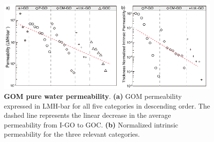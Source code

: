 \begin{figure}
  \centering
  \includegraphics[width=6in]{paper2/Fig2.pdf}
  \caption{\textbf{GOM pure water permeability}. \textbf{(a)} GOM permeability expressed in LMH-bar for all five categories in descending order. The dashed line represents the linear decrease in the average permeability from I-GO to GOC. \textbf{(b)} Normalized intrinsic permeability for the three relevant categories.}
  \label{Fig2_pap2}
\end{figure}

